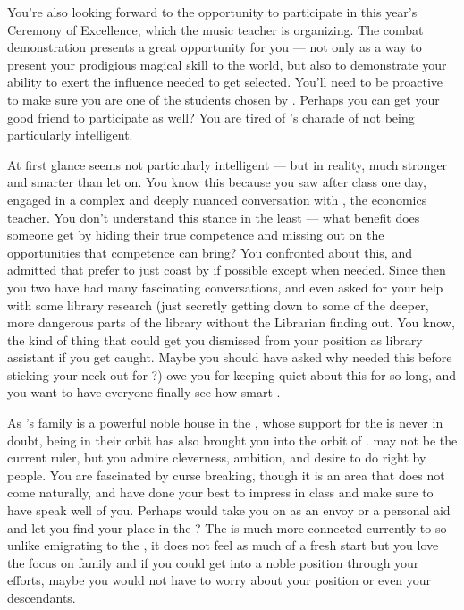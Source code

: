 \documentclass[char]{GL2020}
\begin{document}
You're also looking forward to the opportunity to participate in this year's Ceremony of Excellence, which the music teacher \cMusic{\full} is organizing. The combat demonstration presents a great opportunity for you — not only as a way to present your prodigious magical skill to the world, but also to demonstrate your ability to exert the influence needed to get selected. You'll need to be proactive to make sure you are one of the students chosen by \cMusic{}. Perhaps you can get your good friend \cChupStudent{\full} to participate as well? You are tired of \cChupStudent{}’s charade of not being particularly intelligent.

At first glance \cChupStudent{} seems not particularly intelligent — but in reality, \cChupStudent{\theyare} much stronger and smarter than \cChupStudent{\they} let\cChupStudent{\verbs} on. You know this because you saw \cChupStudent{} after class one day, engaged in a complex and deeply nuanced conversation with \cChupSecond{}, the economics teacher. You don't understand this stance in the least — what benefit does someone get by hiding their true competence and missing out on the opportunities that competence can bring? You confronted \cChupStudent{\them} about this, and \cChupStudent{\they} admitted that \cChupStudent{\they} prefer\cChupStudent{\verbs} to just coast by if possible except when needed. Since then you two have had many fascinating conversations, and \cChupStudent{\they \have} even asked for your help with some library research (just secretly getting down to some of the deeper, more dangerous parts of the library without the Librarian finding out. You know, the kind of thing that could get you dismissed from your position as library assistant if you get caught. Maybe you should have asked why \cChupStudent{} needed this before sticking your neck out for \cChupStudent{\them}?) \cChupStudent{\They} owe\cChupStudent{\verbs} you for keeping quiet about this for so long, and you want to have everyone finally see how smart \cChupStudent{\theyare}.

As \cChupStudent{}’s family is a powerful noble house in the \pFarm{}, whose support for the \cQueen{} is never in doubt, being in their orbit has also brought you into the orbit of \cPrince{\full}. \cPrince{\They} may not be the current ruler, but you admire \cPrince{\their} cleverness, \cPrince{\their} ambition, and \cPrince{\their} desire to do right by \cPrince{\their} people. You are fascinated by curse breaking, though it is an area that does not come naturally, and have done your best to impress \cPrince{\them} in class and make sure to have \cChupStudent{} speak well of you. Perhaps \cPrince{\they} would take you on as an envoy or a personal aid and let you find your place in the \pFarm{}? The \pFarm{} is much more connected currently to \pTech{} so unlike emigrating to the \pShip{}, it does not feel as much of a fresh start but you love the focus on family and if you could get into a noble position through your efforts, maybe you would not have to worry about your position or even your descendants. 
\end{document}
